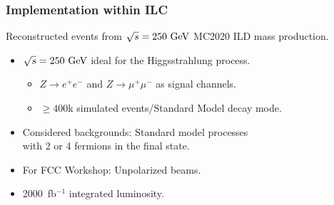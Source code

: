 \begin{frame}
    \frametitle{Implementation within ILC}
    Reconstructed events from $\sqrt{s} = 250~\text{G\text{e\kern-0.15ex V}}$ MC2020 ILD mass production.
    \begin{itemize}
        \item $\sqrt{s} = 250~\text{G\text{e\kern-0.15ex V}}$ ideal for the Higgsstrahlung process.
        \begin{itemize}
            \item $Z \to e^+ e^-$ and $Z \to \mu^+ \mu^-$ as signal channels.
            \item $\geq 400$k simulated events/Standard Model decay mode.
        \end{itemize}
        \item Considered backgrounds: Standard model processes \\
            with 2 or 4 fermions in the final state.
        \item For FCC Workshop: Unpolarized beams.
        \item 2000~fb$^{-1}$ integrated luminosity.
    \end{itemize}
    \end{frame}
